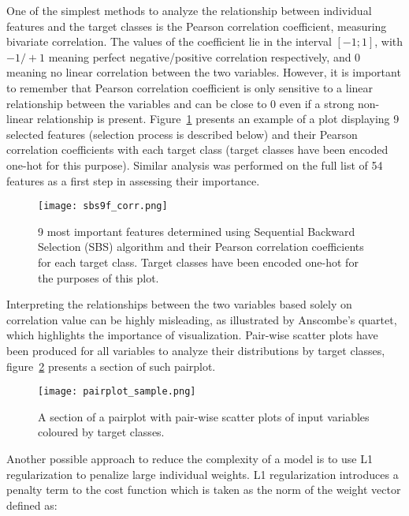 One of the simplest methods to analyze the relationship between individual features and the target classes is the Pearson correlation coefficient, measuring bivariate correlation.
The values of the coefficient lie in the interval $[-1; 1]$, with $-1/+1$ meaning perfect negative/positive correlation respectively, and 0 meaning no linear correlation between the two variables.
However, it is important to remember that Pearson correlation coefficient is only sensitive to a linear relationship between the variables and can be close to 0 even if a strong non-linear relationship is present.
Figure~\ref{fig:sbs9f_corr} presents an example of a plot displaying 9 selected features (selection process is described below) and their Pearson correlation coefficients with each target class (target classes have been encoded one-hot for this purpose).
Similar analysis was performed on the full list of 54 features as a first step in assessing their importance.

\begin{figure}[hbt!]
    \centering
    \texttt{[image: sbs9f\_corr.png]}
    \caption{9 most important features determined using Sequential Backward Selection (SBS) algorithm and their Pearson correlation coefficients for each target class.
    Target classes have been encoded one-hot for the purposes of this plot.}
    \label{fig:sbs9f_corr}
\end{figure}

Interpreting the relationships between the two variables based solely on correlation value can be highly misleading, as illustrated by Anscombe's quartet\cite{Anscombe1973}, which highlights the importance of visualization.
Pair-wise scatter plots have been produced for all variables to analyze their distributions by target classes, figure~\ref{fig:pairplot_sample} presents a section of such pairplot.

\begin{figure}[hbt!]
    \centering
    \texttt{[image: pairplot\_sample.png]}
    \caption{A section of a pairplot with pair-wise scatter plots of input variables coloured by target classes.}
    \label{fig:pairplot_sample}
\end{figure}

Another possible approach to reduce the complexity of a model is to use L1 regularization to penalize large individual weights.
L1 regularization introduces a penalty term to the cost function which is taken as the norm of the weight vector defined as:

